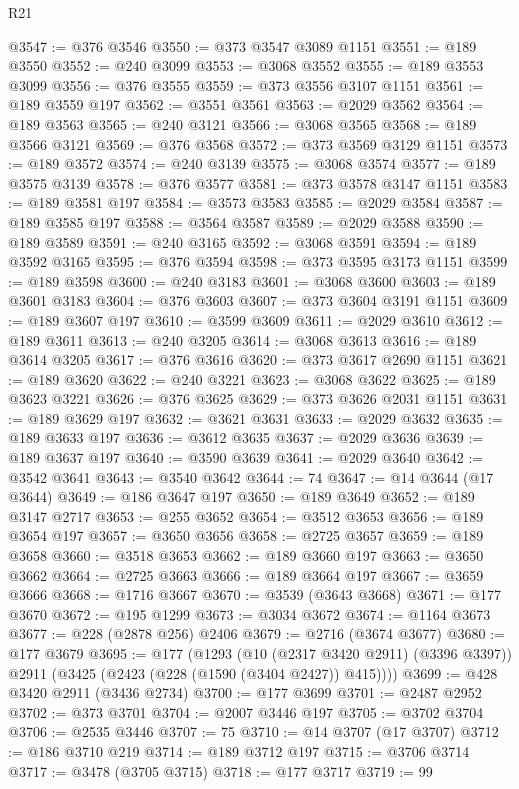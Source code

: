 \begin{lexlean}{R21}
\begin{coremodule}
@3547 := @376 @3546
@3550 := @373 @3547 @3089 @1151
@3551 := @189 @3550
@3552 := @240 @3099
@3553 := @3068 @3552
@3555 := @189 @3553 @3099
@3556 := @376 @3555
@3559 := @373 @3556 @3107 @1151
@3561 := @189 @3559 @197
@3562 := @3551 @3561
@3563 := @2029 @3562
@3564 := @189 @3563
@3565 := @240 @3121
@3566 := @3068 @3565
@3568 := @189 @3566 @3121
@3569 := @376 @3568
@3572 := @373 @3569 @3129 @1151
@3573 := @189 @3572
@3574 := @240 @3139
@3575 := @3068 @3574
@3577 := @189 @3575 @3139
@3578 := @376 @3577
@3581 := @373 @3578 @3147 @1151
@3583 := @189 @3581 @197
@3584 := @3573 @3583
@3585 := @2029 @3584
@3587 := @189 @3585 @197
@3588 := @3564 @3587
@3589 := @2029 @3588
@3590 := @189 @3589
@3591 := @240 @3165
@3592 := @3068 @3591
@3594 := @189 @3592 @3165
@3595 := @376 @3594
@3598 := @373 @3595 @3173 @1151
@3599 := @189 @3598
@3600 := @240 @3183
@3601 := @3068 @3600
@3603 := @189 @3601 @3183
@3604 := @376 @3603
@3607 := @373 @3604 @3191 @1151
@3609 := @189 @3607 @197
@3610 := @3599 @3609
@3611 := @2029 @3610
@3612 := @189 @3611
@3613 := @240 @3205
@3614 := @3068 @3613
@3616 := @189 @3614 @3205
@3617 := @376 @3616
@3620 := @373 @3617 @2690 @1151
@3621 := @189 @3620
@3622 := @240 @3221
@3623 := @3068 @3622
@3625 := @189 @3623 @3221
@3626 := @376 @3625
@3629 := @373 @3626 @2031 @1151
@3631 := @189 @3629 @197
@3632 := @3621 @3631
@3633 := @2029 @3632
@3635 := @189 @3633 @197
@3636 := @3612 @3635
@3637 := @2029 @3636
@3639 := @189 @3637 @197
@3640 := @3590 @3639
@3641 := @2029 @3640
@3642 := @3542 @3641
@3643 := @3540 @3642
@3644 := 74
@3647 := @14 @3644 (@17 @3644)
@3649 := @186 @3647 @197
@3650 := @189 @3649
@3652 := @189 @3147 @2717
@3653 := @255 @3652
@3654 := @3512 @3653
@3656 := @189 @3654 @197
@3657 := @3650 @3656
@3658 := @2725 @3657
@3659 := @189 @3658
@3660 := @3518 @3653
@3662 := @189 @3660 @197
@3663 := @3650 @3662
@3664 := @2725 @3663
@3666 := @189 @3664 @197
@3667 := @3659 @3666
@3668 := @1716 @3667
@3670 := @3539 (@3643 @3668)
@3671 := @177 @3670
@3672 := @195 @1299
@3673 := @3034 @3672
@3674 := @1164 @3673
@3677 := @228 (@2878 @256) @2406
@3679 := @2716 (@3674 @3677)
@3680 := @177 @3679
@3695 := @177
    (@1293
      (@10 (@2317 @3420 @2911) (@3396 @3397))
      @2911
      (@3425 (@2423 (@228 (@1590 (@3404 @2427)) @415))))
@3699 := @428 @3420 @2911 (@3436 @2734)
@3700 := @177 @3699
@3701 := @2487 @2952
@3702 := @373 @3701
@3704 := @2007 @3446 @197
@3705 := @3702 @3704
@3706 := @2535 @3446
@3707 := 75
@3710 := @14 @3707 (@17 @3707)
@3712 := @186 @3710 @219
@3714 := @189 @3712 @197
@3715 := @3706 @3714
@3717 := @3478 (@3705 @3715)
@3718 := @177 @3717
@3719 := 99

\end{coremodule}
\end{lexlean}
